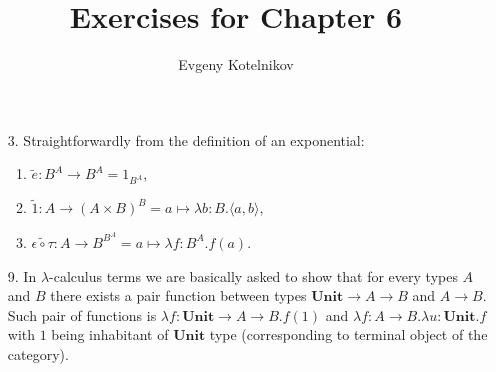 \documentclass[12pt]{article}
\author{Evgeny Kotelnikov}
\title{Exercises for Chapter 6}
\date{}
\theoremstyle{definition}
\begin{document}
\maketitle

\begin{enumerate}
  \item[3.]
    Straightforwardly from the definition of an exponential:
    \begin{enumerate}
      \item $\tilde{e} : B^A \to B^A = 1_{B^A}$,
      \item $\tilde{1} : A \to (A \times B)^B = a \mapsto \lambda b : B . \langle a , b \rangle$,
      \item $\tilde{\epsilon \circ \tau} : A \to B^{B^A} = a \mapsto \lambda f : B^A . f(a)$.
    \end{enumerate}

  \item[9.]
    In $\lambda$-calculus terms we are basically asked to show that for every types $A$ and $B$ there exists a pair function between types $\mathbf{Unit} \to A \to B $ and $A \to B$. Such pair of functions is $\lambda f : \mathbf{Unit} \to A \to B. f(1)$ and $\lambda f : A \to B. \lambda u : \mathbf{Unit}. f$ with $1$ being inhabitant of $\mathbf{Unit}$ type (corresponding to terminal object of the category).

\end{enumerate}
\end{document}
